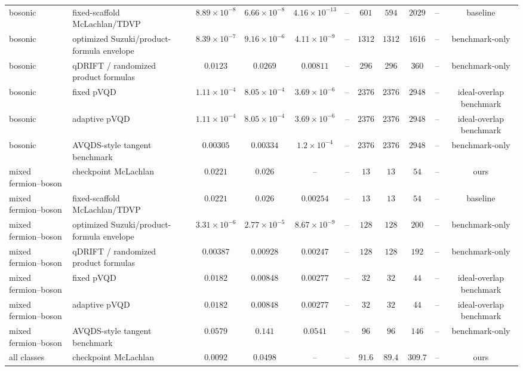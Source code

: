 \documentclass[
  reprint,
  amsmath,
  amssymb,
  aps,
  pra,
  nofootinbib,
  superscriptaddress,
  floatfix
]{revtex4-2}
\begin{document}
\begin{widetext}
\begin{center}
\begin{ruledtabular}
\begin{tabular*}{\textwidth}{@{\extracolsep{\fill}}p{}p{}ccccccccc@{}}
bosonic & fixed-scaffold McLachlan/TDVP & $8.89\!\times\!10^{-8}$ & $6.66\!\times\!10^{-8}$ & $4.16\!\times\!10^{-13}$ & -- & $601$ & $594$ & $2029$ & -- & baseline \\
bosonic & optimized Suzuki/product-formula envelope & $8.39\!\times\!10^{-7}$ & $9.16\!\times\!10^{-6}$ & $4.11\!\times\!10^{-9}$ & -- & $1312$ & $1312$ & $1616$ & -- & benchmark-only \\
bosonic & qDRIFT / randomized product formulas & $0.0123$ & $0.0269$ & $0.00811$ & -- & $296$ & $296$ & $360$ & -- & benchmark-only \\
bosonic & fixed pVQD & $1.11\!\times\!10^{-4}$ & $8.05\!\times\!10^{-4}$ & $3.69\!\times\!10^{-6}$ & -- & $2376$ & $2376$ & $2948$ & -- & ideal-overlap benchmark \\
bosonic & adaptive pVQD & $1.11\!\times\!10^{-4}$ & $8.05\!\times\!10^{-4}$ & $3.69\!\times\!10^{-6}$ & -- & $2376$ & $2376$ & $2948$ & -- & ideal-overlap benchmark \\
bosonic & AVQDS-style tangent benchmark & $0.00305$ & $0.00334$ & $1.2\!\times\!10^{-4}$ & -- & $2376$ & $2376$ & $2948$ & -- & benchmark-only \\
\colrule
mixed fermion--boson & checkpoint McLachlan & $0.0221$ & $0.026$ & -- & -- & $13$ & $13$ & $54$ & -- & ours \\
mixed fermion--boson & fixed-scaffold McLachlan/TDVP & $0.0221$ & $0.026$ & $0.00254$ & -- & $13$ & $13$ & $54$ & -- & baseline \\
mixed fermion--boson & optimized Suzuki/product-formula envelope & $3.31\!\times\!10^{-6}$ & $2.77\!\times\!10^{-5}$ & $8.67\!\times\!10^{-9}$ & -- & $128$ & $128$ & $200$ & -- & benchmark-only \\
mixed fermion--boson & qDRIFT / randomized product formulas & $0.00387$ & $0.00928$ & $0.00247$ & -- & $128$ & $128$ & $192$ & -- & benchmark-only \\
mixed fermion--boson & fixed pVQD & $0.0182$ & $0.00848$ & $0.00277$ & -- & $32$ & $32$ & $44$ & -- & ideal-overlap benchmark \\
mixed fermion--boson & adaptive pVQD & $0.0182$ & $0.00848$ & $0.00277$ & -- & $32$ & $32$ & $44$ & -- & ideal-overlap benchmark \\
mixed fermion--boson & AVQDS-style tangent benchmark & $0.0579$ & $0.141$ & $0.0541$ & -- & $96$ & $96$ & $146$ & -- & benchmark-only \\
\colrule
all classes & checkpoint McLachlan & $0.0092$ & $0.0498$ & -- & -- & $91.6$ & $89.4$ & $309.7$ & -- & ours \\

\end{tabular*}
\end{ruledtabular}
\end{center}
\end{widetext}
\end{document}
